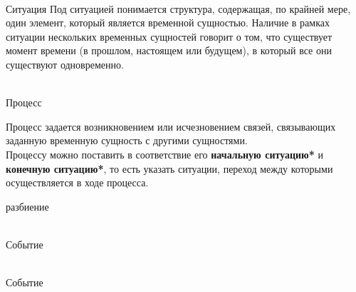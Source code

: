 \begin{frame}{\\Ситуация}
	\topline
	\justifying
	Под ситуацией понимается структура, содержащая, по крайней мере, один элемент, который является временной
	сущностью. Наличие в рамках ситуации нескольких временных сущностей говорит о том, что существует момент	времени (в прошлом, настоящем или будущем), в который все они существуют одновременно.
\end{frame}

\begin{frame}{\\Процесс}
	\topline
	\justifying
	
	\vspace{10mm}
	Процесс задается возникновением или исчезновением связей, связывающих заданную временную сущность с другими сущностями.\\
	Процессу можно поставить в соответствие его \textbf{начальную ситуацию*} и \textbf{конечную ситуацию*}, то есть указать ситуации, переход между которыми осуществляется в ходе процесса.
	\begin{scnrelfromset}{разбиение}
	\end{scnrelfromset}
\end{frame}

\begin{frame}{\\Событие}
	\topline
	\justifying
\end{frame}

\begin{frame}{\\Событие}
	\topline
	\justifying
\end{frame}

